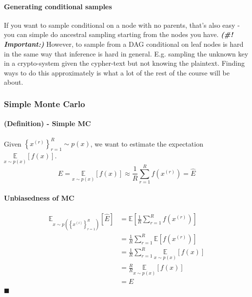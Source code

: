 \documentclass[11pt]{article}
\newcommand{\qed}{\hfill $\blacksquare$}
\begin{document}
\paragraph{Generating conditional samples} If you want to sample conditional on a node with no parents, that's also easy - you can simple do ancestral sampling starting from the nodes you have. \newline \newline
\textit{\textbf{(\#! Important:)}} However, to sample from a DAG conditional on leaf nodes is hard in the same way that inference is hard in general. E.g. sampling the unknown key in a crypto-system given the cypher-text but not knowing the plaintext. Finding ways to do this approximately is what a lot of the rest of the course will be about.

\subsubsection{Simple Monte Carlo}
\paragraph{(Definition) - Simple MC} Given $\left\{x^{(r)}\right\}_{r=1}^{R} \sim p(x)$, we want to estimate the expectation $\underset{x \sim p(x)}{\mathbb{E}}[f(x)]$.
\begin{equation*}
    E=\underset{x \sim p(x)}{\mathbb{E}}[f(x)] \approx \frac{1}{R} \sum_{r=1}^{R} f\left(x^{(r)}\right)=\hat{E}
\end{equation*}
\paragraph{Unbiasedness of MC}
\begin{align*}
    \mathbb{E}_{x \sim p\left(\left\{x^{(i)}\right\}_{r=1}^{R}\right)}[\hat{E}]
    &=\mathbb{E}\left[\frac{1}{R} \sum_{r=1}^{R} f\left(x^{(r)}\right)\right] \\
    &= \frac{1}{R} \sum_{r=1}^{R} \mathbb{E}\left[f\left(x^{(r)}\right)\right]\\
    &= \frac{1}{R} \sum_{r=1}^{R} \underset{x \sim p(x)}{\mathbb{E}}[f(x)] \\
    &= \frac{R}{R} \underset{x \sim p(x)}{\mathbb{E}}[f(x)] \\
    &= E
\end{align*}
\qed
\end{document}
